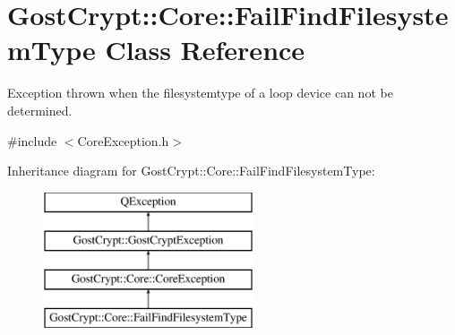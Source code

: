 \hypertarget{class_gost_crypt_1_1_core_1_1_fail_find_filesystem_type}{}\section{Gost\+Crypt\+:\+:Core\+:\+:Fail\+Find\+Filesystem\+Type Class Reference}
\label{class_gost_crypt_1_1_core_1_1_fail_find_filesystem_type}


Exception thrown when the filesystemtype of a loop device can not be determined.  




{\ttfamily \#include $<$Core\+Exception.\+h$>$}

Inheritance diagram for Gost\+Crypt\+:\+:Core\+:\+:Fail\+Find\+Filesystem\+Type\+:\begin{figure}[H]
\begin{center}
\leavevmode
\includegraphics[height=4.000000cm]{class_gost_crypt_1_1_core_1_1_fail_find_filesystem_type}
\end{center}
\end{figure}
